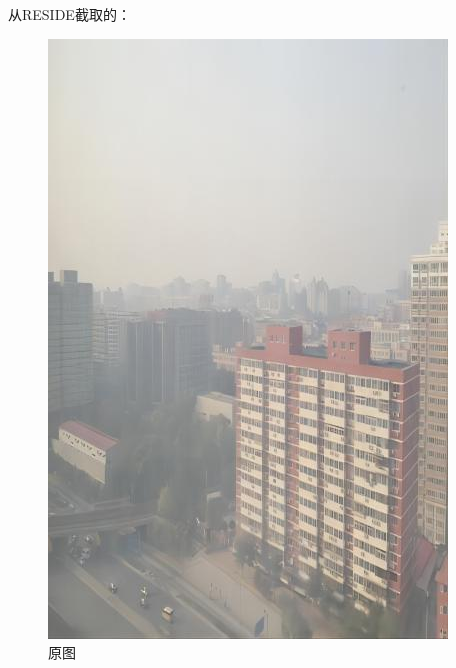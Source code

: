 \documentclass[12pt]{article}
\begin{document}
 从RESIDE截取的：\begin{figure}[!h]
    \centering
    \begin{minipage}[t]{0.24\linewidth}
        \centering
        \includegraphics[width=0.9\linewidth]{sample_pictures/RESIDE-example.jpg}
        \caption*{原图}
    \end{minipage}
    \begin{minipage}[t]{0.24\linewidth}
        \centering

\end{minipage}
\end{figure}
\end{document}
